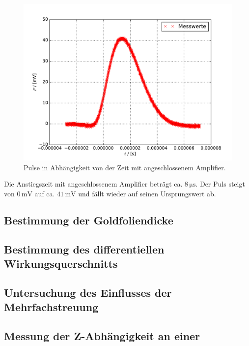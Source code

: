 \begin{figure}[H]
  \centering
  \includegraphics[width=\textwidth]{osz1.pdf}
  \caption{Pulse in Abhängigkeit von der Zeit mit angeschlossenem Amplifier.}
  \label{fig:1}
\end{figure}

Die Anstiegszeit mit angeschlossenem Amplifier beträgt ca. $8\,\si{\micro\second}$.
Der Puls steigt von $0\,\text{mV}$ auf ca. $41\,\text{mV}$ und fällt wieder auf seinen Ursprungswert ab.

\subsection{Bestimmung der Goldfoliendicke}


\subsection{Bestimmung des differentiellen Wirkungsquerschnitts}

\subsection{Untersuchung des Einflusses der Mehrfachstreuung}

\subsection{Messung der Z-Abhängigkeit an einer }
